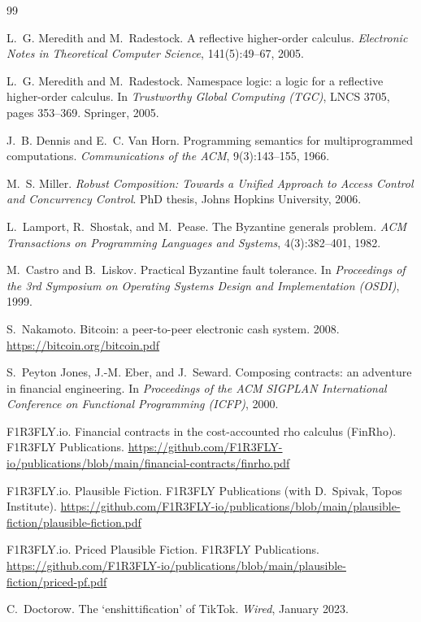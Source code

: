 \documentclass[11pt]{article}
\begin{document}
\begin{thebibliography}{99}

 L.~G. Meredith and M.~Radestock. A reflective higher-order calculus. \emph{Electronic Notes in Theoretical Computer Science}, 141(5):49--67, 2005.

 L.~G. Meredith and M.~Radestock. Namespace logic: a logic for a reflective higher-order calculus. In \emph{Trustworthy Global Computing (TGC)}, LNCS 3705, pages 353--369. Springer, 2005.

 J.~B. Dennis and E.~C. Van Horn. Programming semantics for multiprogrammed computations. \emph{Communications of the ACM}, 9(3):143--155, 1966.

 M.~S. Miller. \emph{Robust Composition: Towards a Unified Approach to Access Control and Concurrency Control}. PhD thesis, Johns Hopkins University, 2006.

 L.~Lamport, R.~Shostak, and M.~Pease. The Byzantine generals problem. \emph{ACM Transactions on Programming Languages and Systems}, 4(3):382--401, 1982.

 M.~Castro and B.~Liskov. Practical Byzantine fault tolerance. In \emph{Proceedings of the 3rd Symposium on Operating Systems Design and Implementation (OSDI)}, 1999.

 S.~Nakamoto. Bitcoin: a peer-to-peer electronic cash system. 2008. \url{https://bitcoin.org/bitcoin.pdf}

 S.~Peyton Jones, J.-M. Eber, and J.~Seward. Composing contracts: an adventure in financial engineering. In \emph{Proceedings of the ACM SIGPLAN International Conference on Functional Programming (ICFP)}, 2000.

 F1R3FLY.io. Financial contracts in the cost-accounted rho calculus (FinRho). F1R3FLY Publications. \url{https://github.com/F1R3FLY-io/publications/blob/main/financial-contracts/finrho.pdf}

 F1R3FLY.io. Plausible Fiction. F1R3FLY Publications (with D.~Spivak, Topos Institute). \url{https://github.com/F1R3FLY-io/publications/blob/main/plausible-fiction/plausible-fiction.pdf}

 F1R3FLY.io. Priced Plausible Fiction. F1R3FLY Publications. \url{https://github.com/F1R3FLY-io/publications/blob/main/plausible-fiction/priced-pf.pdf}

 C.~Doctorow. The `enshittification' of TikTok. \emph{Wired}, January 2023.


\end{thebibliography}
\end{document}
